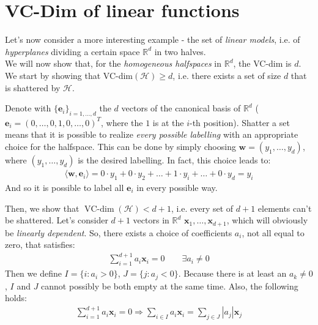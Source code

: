 \documentclass[../template.tex]{subfiles}
\begin{document}
\section{VC-Dim of linear functions}
Let's now consider a more interesting example - the set of \textit{linear models}, i.e. of \textit{hyperplanes} dividing a certain space $\mathbb{R}^d$ in two halves.\\
We will now show that, for the \textit{homogeneous halfspaces} in $\mathbb{R}^d$, the VC-dim is $d$.\\
We start by showing that VC-dim$(\mathcal{H}) \geq d$, i.e. there exists a set of size $d$ that is shattered by $\mathcal{H}$.

Denote with $\{\bm{e}_i\}_{i=1,\dots,d}$ the $d$ vectors of the canonical basis of $\mathbb{R}^d$ ($\bm{e}_i = (0,\dots,0,1,0,\dots,0)^T$, where the $1$ is at the $i$-th position). Shatter a set means that it is possible to realize \textit{every possible labelling} with an appropriate choice for the halfspace. This can be done by simply choosing $\bm{w} = (y_1, \dots, y_d)$, where $(y_1, \dots, y_d)$ is the desired labelling. In fact, this choice leads to:
\begin{align*}
    \langle \bm{w}, \bm{e}_i \rangle = 0\cdot y_1 + 0 \cdot y_2 + \dots + 1 \cdot y_i + \dots + 0 \cdot y_d = y_i
\end{align*}  
And so it is possible to label all $\bm{e}_i$ in every possible way.

Then, we show that $\operatorname{VC-dim}(\mathcal{H}) < d+1$, i.e. every set of $d+1$ elements can't be shattered. Let's consider $d+1$ vectors in $\mathbb{R}^d$  $\bm{x}_1, \dots, \bm{x}_{d+1}$, which will obviously be \textit{linearly dependent}. So, there exists a choice of coefficients $a_i$, not all equal to zero, that satisfies:
\begin{align*}
    \sum_{i=1}^{d+1} a_i \bm{x}_i = 0 \qquad \exists a_i \neq 0
\end{align*}  
Then we define $I=\{i\colon a_i > 0\}$, $J = \{j\colon a_j < 0\}$. Because there is at least an $a_k \neq 0$, $I$ and $J$ cannot possibly be both empty at the same time. Also, the following holds:
\begin{align}
    \sum_{i=1}^{d+1} a_i \bm{x}_i = 0 \Rightarrow \sum_{i\in I} a_i \bm{x}_i = \sum_{j\in J} |a_j| \bm{x}_j
    \label{eqn:indices}
\end{align}
\end{document}
